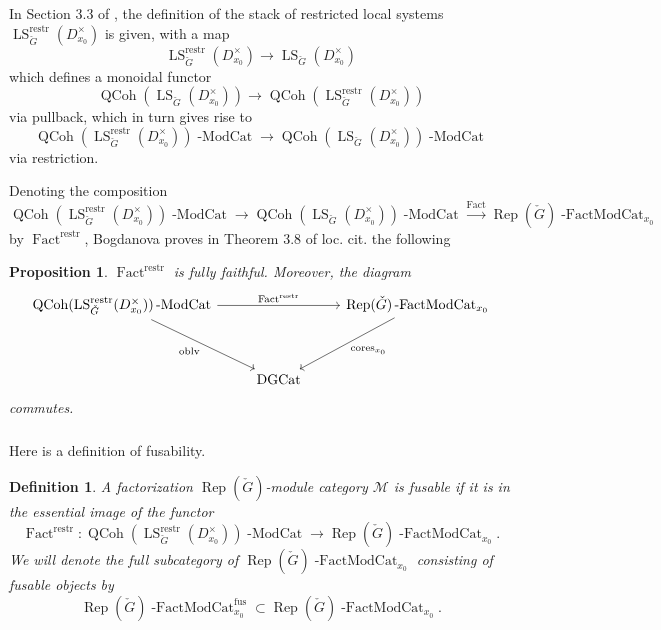 \documentclass[10pt,a4paper]{amsart}
\newtheorem{prop}[subsubsection]{Proposition}
\newtheorem{defn}[subsubsection]{Definition}
\newcommand{\on}[1]{\operatorname{#1}}
\newcommand{\QCoh}{\on{QCoh}}
\newcommand{\Gcheck}{\check{G}}
\newcommand{\sssec}[1]{\subsubsection{}}
\begin{document}
\sssec{}
In Section 3.3 of \cite{Katia}, the definition of the stack of restricted local systems $\on{LS}_{\Gcheck}^{\on{restr}}(D_{x_0}^{\times})$ is given, with a map
$$
\on{LS}_{\Gcheck}^{\on{restr}}(D_{x_0}^{\times}) \longrightarrow \on{LS}_{\Gcheck}(D_{x_0}^{\times})
$$
which defines a monoidal functor
$$
\QCoh(\on{LS}_{\Gcheck}(D_{x_0}^{\times})) \longrightarrow \QCoh(\on{LS}_{\Gcheck}^{\on{restr}}(D_{x_0}^{\times}))
$$
via pullback, which in turn gives rise to
$$
\QCoh(\on{LS}_{\Gcheck}^{\on{restr}}(D_{x_0}^{\times}))\on{-ModCat} \longrightarrow \QCoh(\on{LS}_{\Gcheck}(D_{x_0}^{\times}))\on{-ModCat}
$$
via restriction.

Denoting the composition
$$
\QCoh(\on{LS}_{\Gcheck}^{\on{restr}}(D_{x_0}^{\times}))\on{-ModCat} \longrightarrow \QCoh(\on{LS}_{\Gcheck}(D_{x_0}^{\times}))\on{-ModCat} \overset{\on{Fact}}{\longrightarrow} \on{Rep}(\Gcheck)\on{-FactModCat}_{x_0} 
$$
by $\on{Fact}^{\on{restr}}$, Bogdanova proves in Theorem 3.8 of loc. cit. the following
\begin{prop}
    $\on{Fact}^{\on{restr}}$ is fully faithful. Moreover, the diagram
    $$
    \begin{tikzcd}
        {\QCoh(\on{LS}_{\Gcheck}^{\on{restr}}(D_{x_0}^{\times}))\on{-ModCat}} && {\on{Rep}(\Gcheck)\on{-FactModCat}_{x_0}} \\
	\\
	& {\on{DGCat}}
	\arrow["{\on{Fact}^{\on{restr}}}", from=1-1, to=1-3]
	\arrow["{\on{oblv}}"', from=1-1, to=3-2]
	\arrow["{\on{cores}_{x_0}}", from=1-3, to=3-2]
    \end{tikzcd}
    $$
    commutes.
\end{prop}

\sssec{}
Here is a definition of fusability.

\begin{defn}
    A factorization $\on{Rep}(\Gcheck)$-module category $\mathcal{M}$ is fusable if it is in the essential image of the functor
    $$
    \on{Fact}^{\on{restr}} : \QCoh(\on{LS}_{\Gcheck}^{\on{restr}}(D_{x_0}^{\times}))\on{-ModCat} \longrightarrow \on{Rep}(\Gcheck)\on{-FactModCat}_{x_0}.
    $$
    We will denote the full subcategory of $\on{Rep}(\Gcheck)\on{-FactModCat}_{x_0}$ consisting of fusable objects by
    $$
    \on{Rep}(\Gcheck)\on{-FactModCat}_{x_0}^{\on{fus}} \subset \on{Rep}(\Gcheck)\on{-FactModCat}_{x_0}.
    $$
\end{defn}
\end{document}
